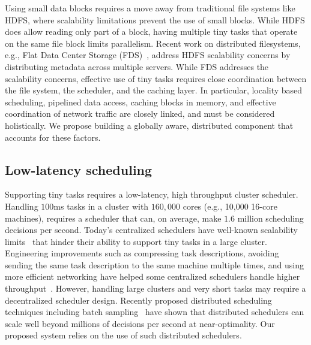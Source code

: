 Using small data blocks requires a move away from traditional file systems like
HDFS, where scalability limitations prevent the use of small blocks.
While HDFS does allow reading only part of a block, having multiple tiny tasks
that operate on the same file block limits parallelism.
Recent work on distributed filesystems, e.g., Flat Data Center
Storage (FDS)~\cite{nightingale2012flat}, address HDFS scalability concerns by
distributing metadata across multiple servers. While FDS addresses the scalability
concerns, effective use of tiny tasks requires close coordination between the file
system, the scheduler, and the caching layer.
In particular, locality based scheduling, pipelined data access, caching blocks in 
memory, and effective coordination of network traffic are closely linked, and 
must be considered holistically. We propose building a globally aware, distributed
component that accounts for these factors.



\subsection{Low-latency scheduling}
Supporting tiny tasks requires a low-latency, high throughput cluster scheduler.
Handling $100$ms tasks in a cluster with $160,000$ cores
(e.g., 10,000 16-core machines),
requires a scheduler that can, on average, make $1.6$ million scheduling
decisions per second.
Today's centralized schedulers have well-known scalability
limits~\cite{wilkesberkeley} that
hinder their ability to support tiny tasks in a large cluster.
Engineering improvements such as compressing task descriptions,
avoiding sending the same task description to the same machine multiple
times, and using more efficient networking have helped some
centralized schedulers
handle higher throughput~\cite{zaharia2012meetup}.
However, handling large clusters and very
short tasks may require a decentralized scheduler design.
Recently proposed distributed scheduling techniques including batch
sampling~\cite{ousterhoutbatch} have shown that distributed schedulers
can scale well beyond millions of decisions per second at near-optimality.
Our proposed system relies on the use of such distributed schedulers.

